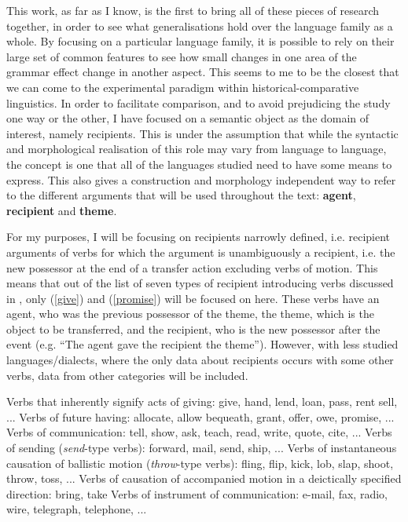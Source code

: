 This work, as far as I know, is the first to bring all of these pieces of research together, in order to see what generalisations hold over the language family as a whole. By focusing on a particular language family, it is possible to rely on their large set of common features to see how small changes in one area of the grammar effect change in another aspect. This seems to me to be the closest that we can come to the experimental paradigm within historical-comparative linguistics. In order to facilitate comparison, and to avoid prejudicing the study one way or the other, I have focused on a semantic object as the domain of interest, namely recipients. This is under the assumption that while the syntactic and morphological realisation of this role may vary from language to language, the concept is one that all of the languages studied need to have some means to express.  This also gives a construction and morphology independent way to refer to the different arguments that will be used throughout the text: \textbf{agent}, \textbf{recipient} and \textbf{theme}.

For my purposes, I will be focusing on recipients narrowly defined, i.e. recipient arguments of verbs for which the argument is unambiguously a recipient, i.e. the new possessor at the end of a transfer action excluding verbs of motion. This means that out of the list of seven types of recipient introducing verbs discussed in \cite{Hovav.2008}, only (\ref{give}) and (\ref{promise}) will be focused on here. These verbs have an agent, who was the previous possessor of the theme, the theme, which is the object to be transferred, and the recipient, who is the new possessor after the event (e.g. ``The agent gave the recipient the theme''). However, with less studied languages/dialects, where the only data about recipients occurs with some other verbs, data from other categories will be included. 

\begin{exe}
\ex
\begin{xlist}
\ex\label{give} Verbs that inherently signify acts of giving: give, hand, lend, loan, pass, rent sell, ...
\ex \label{promise} Verbs of future having: allocate, allow bequeath, grant, offer, owe, promise, ...
\ex \label{tell} Verbs of communication: tell, show, ask, teach, read, write, quote, cite, ...
\ex \label{send} Verbs of sending (\emph{send}-type verbs): forward, mail, send, ship, ...
\ex \label{throw} Verbs of instantaneous causation of ballistic motion (\emph{throw}-type verbs): fling, flip, kick, lob, slap, shoot, throw, toss, ...
\ex \label{bring} Verbs of causation of accompanied motion in a deictically specified direction: bring, take
\ex \label{fax} Verbs of instrument of communication: e-mail, fax, radio, wire, telegraph, telephone, ...
\end{xlist}
\end{exe}

